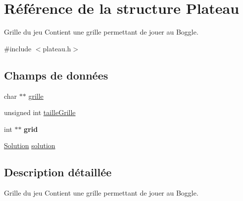 \hypertarget{structPlateau}{
\section{Référence de la structure Plateau}
\label{structPlateau}
}


Grille du jeu Contient une grille permettant de jouer au Boggle.  




{\ttfamily \#include $<$plateau.h$>$}

\subsection*{Champs de données}
\begin{DoxyCompactItemize}
\item 
char $\ast$$\ast$ \hyperlink{structPlateau_a42411aa44b78d298681030ce3461f686}{grille}
\item 
unsigned int \hyperlink{structPlateau_aa71d603afaf91ff7c81427af61919a34}{tailleGrille}
\item 
\hypertarget{structPlateau_aeb94d618db5af1b25a4f64042a4ad771}{
int $\ast$$\ast$ {\bfseries grid}}
\label{structPlateau_aeb94d618db5af1b25a4f64042a4ad771}

\item 
\hyperlink{structSolution}{Solution} \hyperlink{structPlateau_aed88af50891b17edcd3ba97d7098dfde}{solution}
\end{DoxyCompactItemize}


\subsection{Description détaillée}
Grille du jeu Contient une grille permettant de jouer au Boggle. 

